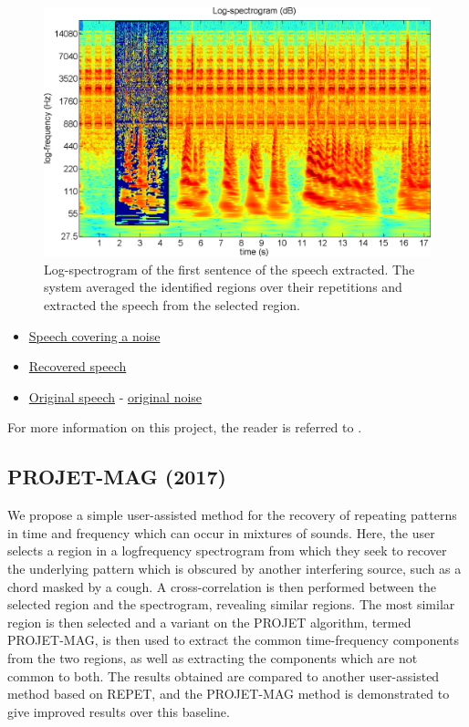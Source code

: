 \documentclass{article}
\begin{document}
\begin{figure}[!htb]
\centering
\includegraphics[width=\columnwidth]{Images/urepet_example3b.png}
\caption{Log-spectrogram of the first sentence of the speech extracted. The system averaged the identified regions over their repetitions and extracted the speech from the selected region.}
\label{fig:urepet_example3b}
\end{figure}

\begin{itemize}[noitemsep,topsep=0pt]
\item \href{Audio/uREPET/speech&noise.wav}{Speech covering a noise}
\item \href{Audio/uREPET/speech-noise.wav}{Recovered speech}
\item \href{Audio/uREPET/speech.wav}{Original speech} - \href{Audio/REPET/noise.wav}{original noise}
\end{itemize}

For more information on this project, the reader is referred to \cite{inproceedings_rafii_apr2015}.


\subsection{PROJET-MAG (2017)}
\label{ssec:projet-mag}

We propose a simple user-assisted method for the recovery of repeating patterns in time and frequency which can occur in mixtures of sounds. Here, the user selects a region in a logfrequency spectrogram from which they seek to recover the underlying pattern which is obscured by another interfering source, such as a chord masked by a cough. A cross-correlation is then performed between the selected region and the spectrogram, revealing similar regions. The most similar region is then selected and a variant on the PROJET algorithm, termed PROJET-MAG, is then used to extract the common time-frequency components from the two regions, as well as extracting the components which are not common to both. The results obtained are compared to another user-assisted method based on REPET, and the PROJET-MAG method is demonstrated to give improved results over this baseline.
\end{document}
